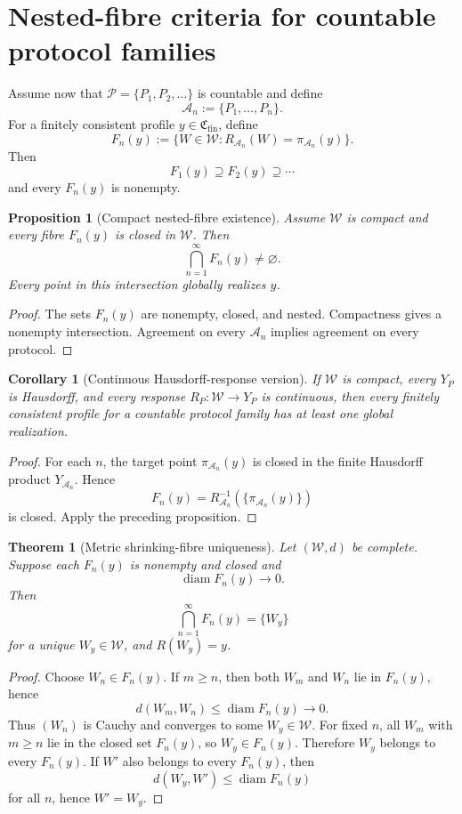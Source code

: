 \documentclass[11pt]{article}
\newtheorem{proposition}[definition]{Proposition}
\newtheorem{theorem}[definition]{Theorem}
\newtheorem{corollary}[definition]{Corollary}
\newcommand{\W}{\mathcal W}
\newcommand{\Pcal}{\mathcal P}
\newcommand{\Acal}{\mathcal A}
\newcommand{\Cfin}{\mathfrak C_{\mathrm{fin}}}
\begin{document}
\section{Nested-fibre criteria for countable protocol families}

Assume now that $\Pcal=\{P_1,P_2,\ldots\}$ is countable and define
\[
\Acal_n:=\{P_1,\ldots,P_n\}.
\]
For a finitely consistent profile $y\in\Cfin$, define
\[
F_n(y)
:=
\{W\in\W:R_{\Acal_n}(W)=\pi_{\Acal_n}(y)\}.
\]
Then
\[
F_1(y)\supseteq F_2(y)\supseteq\cdots
\]
and every $F_n(y)$ is nonempty.

\begin{proposition}[Compact nested-fibre existence]
Assume $\W$ is compact and every fibre $F_n(y)$ is closed in $\W$. Then
\[
\bigcap_{n=1}^{\infty}F_n(y)\neq\varnothing.
\]
Every point in this intersection globally realizes $y$.
\end{proposition}

\begin{proof}
The sets $F_n(y)$ are nonempty, closed, and nested. Compactness gives a
nonempty intersection. Agreement on every $\Acal_n$ implies agreement on every
protocol.
\end{proof}

\begin{corollary}[Continuous Hausdorff-response version]
If $\W$ is compact, every $Y_P$ is Hausdorff, and every response
$R_P:\W\to Y_P$ is continuous, then every finitely consistent profile for a
countable protocol family has at least one global realization.
\end{corollary}

\begin{proof}
For each $n$, the target point $\pi_{\Acal_n}(y)$ is closed in the finite
Hausdorff product $Y_{\Acal_n}$. Hence
\[
F_n(y)=R_{\Acal_n}^{-1}\!\left(\{\pi_{\Acal_n}(y)\}\right)
\]
is closed. Apply the preceding proposition.
\end{proof}

\begin{theorem}[Metric shrinking-fibre uniqueness]\label{thm:shrinking}
Let $(\W,d)$ be complete. Suppose each $F_n(y)$ is nonempty and closed and
\[
\operatorname{diam}F_n(y)\longrightarrow0.
\]
Then
\[
\bigcap_{n=1}^{\infty}F_n(y)
=
\{W_y\}
\]
for a unique $W_y\in\W$, and $R(W_y)=y$.
\end{theorem}

\begin{proof}
Choose $W_n\in F_n(y)$. If $m\ge n$, then both $W_m$ and $W_n$ lie in
$F_n(y)$, hence
\[
d(W_m,W_n)\le\operatorname{diam}F_n(y)\to0.
\]
Thus $(W_n)$ is Cauchy and converges to some $W_y\in\W$. For fixed $n$, all
$W_m$ with $m\ge n$ lie in the closed set $F_n(y)$, so $W_y\in F_n(y)$.
Therefore $W_y$ belongs to every $F_n(y)$. If $W'$ also belongs to every
$F_n(y)$, then
\[
d(W_y,W')\le\operatorname{diam}F_n(y)
\]
for all $n$, hence $W'=W_y$.
\end{proof}
\end{document}
